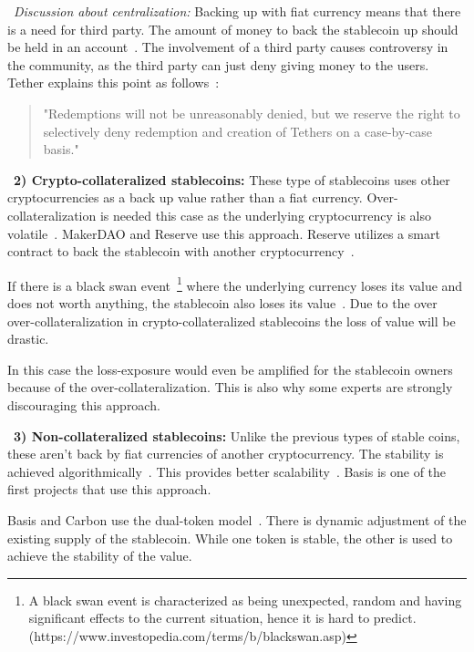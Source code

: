 ~\textit{Discussion about centralization:} Backing up with fiat currency means that there is a need for third party. The amount of money to back the stablecoin up should be held in an account~\cite{techrev}. The involvement of a third party causes controversy in the community, as the third party can just deny giving money to the users. Tether explains this point as follows~\cite{cryptoinsider}:

\begin{quote}
"Redemptions will not be unreasonably denied, but we reserve the right to selectively deny redemption and creation of Tethers on a case-by-case basis."
\end{quote}


~\textbf{2) Crypto-collateralized stablecoins:} These type of stablecoins uses other cryptocurrencies as a back up value rather than a fiat currency. Over-collateralization is needed this case as the underlying cryptocurrency is also volatile~\cite{linkedin}. MakerDAO and Reserve use this approach. Reserve utilizes a smart contract to back the stablecoin with another cryptocurrency~\cite{cointelegraph}.

If there is a black swan event~\footnote{A black swan event is characterized as being unexpected, random and having significant effects to the current situation, hence it is hard to predict.(https://www.investopedia.com/terms/b/blackswan.asp)} where the underlying currency loses its value and does not worth anything, the stablecoin also loses its value~\cite{coinsexplained}.  Due to the over over-collateralization in crypto-collateralized stablecoins the loss of value will be drastic.

In this case the loss-exposure would even be amplified for the stablecoin owners because of the over-collateralization. This is also why some experts are strongly discouraging this approach.


~\textbf{3) Non-collateralized stablecoins:} Unlike the previous types of stable coins, these aren't back by fiat currencies of another cryptocurrency. The stability is achieved algorithmically~\cite{linkedin}. This provides better scalability~\cite{report}. Basis is one of the first projects that use this approach.

Basis and Carbon use the dual-token model~\cite{cryptoinsider}. There is dynamic adjustment of the existing supply of the stablecoin. While one token is stable, the other is used to achieve the stability of the value.

